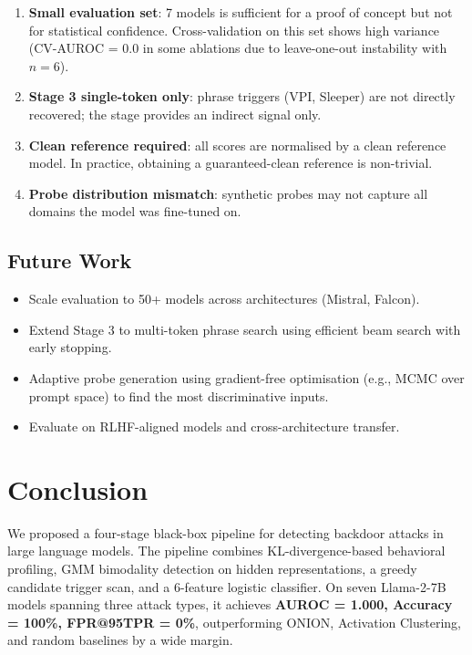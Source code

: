 \documentclass[11pt,a4paper]{article}
\begin{document}
\begin{enumerate}[nosep]
  \item \textbf{Small evaluation set}: 7 models is sufficient for a proof of
    concept but not for statistical confidence. Cross-validation on this set
    shows high variance (CV-AUROC = 0.0 in some ablations due to leave-one-out
    instability with $n = 6$).
  \item \textbf{Stage 3 single-token only}: phrase triggers (VPI, Sleeper) are
    not directly recovered; the stage provides an indirect signal only.
  \item \textbf{Clean reference required}: all scores are normalised by a clean
    reference model. In practice, obtaining a guaranteed-clean reference is
    non-trivial.
  \item \textbf{Probe distribution mismatch}: synthetic probes may not capture
    all domains the model was fine-tuned on.
\end{enumerate}

\subsection{Future Work}

\begin{itemize}[nosep]
  \item Scale evaluation to 50+ models across architectures (Mistral, Falcon).
  \item Extend Stage 3 to multi-token phrase search using efficient beam search
    with early stopping.
  \item Adaptive probe generation using gradient-free optimisation (e.g., MCMC
    over prompt space) to find the most discriminative inputs.
  \item Evaluate on RLHF-aligned models and cross-architecture transfer.
\end{itemize}

\section{Conclusion}

We proposed a four-stage black-box pipeline for detecting backdoor attacks in
large language models. The pipeline combines KL-divergence-based behavioral
profiling, GMM bimodality detection on hidden representations, a greedy
candidate trigger scan, and a 6-feature logistic classifier. On seven
Llama-2-7B models spanning three attack types, it achieves
\textbf{AUROC = 1.000, Accuracy = 100\%, FPR@95TPR = 0\%}, outperforming
ONION, Activation Clustering, and random baselines by a wide margin.
\end{document}
